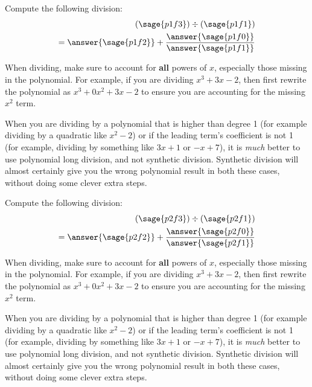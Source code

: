 \documentclass{ximera}
\begin{document}
\begin{problem}

    Compute the following division:
    \begin{align*}
        \left(\sage{p1f3}\right) \div \left(\sage{p1f1}\right) \\
        = \answer{\sage{p1f2}} + \frac{\answer{\sage{p1f0}}}{\answer{\sage{p1f1}}}
    \end{align*}
    \begin{feedback}
        When dividing, make sure to account for \textbf{all} powers of $x$, especially those missing in the polynomial. For example, if you are dividing $x^3 + 3x - 2$, then first rewrite the polynomial as $x^3 + 0x^2 + 3x - 2$ to ensure you are accounting for the missing $x^2$ term.
        
        When you are dividing by a polynomial that is higher than degree 1 (for example dividing by a quadratic like $x^2 -2$) or if the leading term's coefficient is not 1 (for example, dividing by something like $3x+1$ or $-x + 7$), it is \textit{much} better to use polynomial long division, and not synthetic division. Synthetic division will almost certainly give you the wrong polynomial result in both these cases, without doing some clever extra steps.
    \end{feedback}
    
\end{problem}

\begin{problem}
    
    Compute the following division:
    \begin{align*}
        \left(\sage{p2f3}\right) \div \left(\sage{p2f1}\right) \\
        = \answer{\sage{p2f2}} + \frac{\answer{\sage{p2f0}}}{\answer{\sage{p2f1}}}
    \end{align*}
    \begin{feedback}
        When dividing, make sure to account for \textbf{all} powers of $x$, especially those missing in the polynomial. For example, if you are dividing $x^3 + 3x - 2$, then first rewrite the polynomial as $x^3 + 0x^2 + 3x - 2$ to ensure you are accounting for the missing $x^2$ term.
        
        When you are dividing by a polynomial that is higher than degree 1 (for example dividing by a quadratic like $x^2 -2$) or if the leading term's coefficient is not 1 (for example, dividing by something like $3x+1$ or $-x + 7$), it is \textit{much} better to use polynomial long division, and not synthetic division. Synthetic division will almost certainly give you the wrong polynomial result in both these cases, without doing some clever extra steps.
    \end{feedback}
    
\end{problem}
\end{document}
